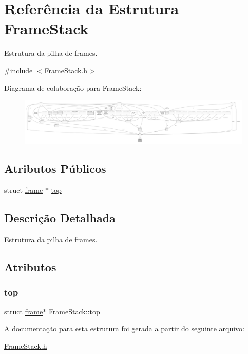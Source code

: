 \hypertarget{structFrameStack}{}\section{Referência da Estrutura Frame\+Stack}
\label{structFrameStack}


Estrutura da pilha de frames.  




{\ttfamily \#include $<$Frame\+Stack.\+h$>$}



Diagrama de colaboração para Frame\+Stack\+:
\nopagebreak
\begin{figure}[H]
\begin{center}
\leavevmode
\includegraphics[width=350pt]{structFrameStack__coll__graph}
\end{center}
\end{figure}
\subsection*{Atributos Públicos}
\begin{DoxyCompactItemize}
\item 
struct \hyperlink{structframe}{frame} $\ast$ \hyperlink{structFrameStack_a0b30458d8eb5565c6fa8db0cb4b4bebd}{top}
\end{DoxyCompactItemize}


\subsection{Descrição Detalhada}
Estrutura da pilha de frames. 

\subsection{Atributos}
\mbox{\label{structFrameStack_a0b30458d8eb5565c6fa8db0cb4b4bebd}} 
\subsubsection{\texorpdfstring{top}{top}}
{\footnotesize\ttfamily struct \hyperlink{structframe}{frame}$\ast$ Frame\+Stack\+::top}



A documentação para esta estrutura foi gerada a partir do seguinte arquivo\+:\begin{DoxyCompactItemize}
\item 
\hyperlink{FrameStack_8h}{Frame\+Stack.\+h}\end{DoxyCompactItemize}
